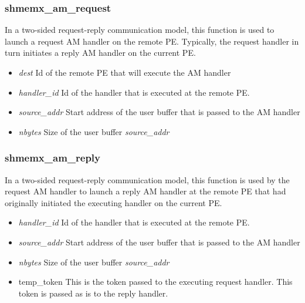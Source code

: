 \subsubsection{shmemx\_am\_request}
In a two-sided request-reply communication model, 
this function is used to launch a request AM handler on 
the remote PE. Typically, the request handler in 
turn initiates a reply AM handler on 
the current PE.\\
  


 \begin{itemize}
     \item \textit{dest} Id of the remote PE that 
         will execute the AM handler
     \item \textit{handler\_id} Id of the handler 
         that is executed at the remote PE.
     \item \textit{source\_addr} Start address of 
         the user buffer that is passed to the 
         AM handler
     \item \textit{nbytes} Size of the user buffer 
         \textit{source\_addr}
 \end{itemize}

\subsubsection{shmemx\_am\_reply}

        In a two-sided request-reply communication 
        model, this function is used by the 
        request
        AM handler to launch a reply AM handler at 
        the remote PE that had originally 
        initiated the executing handler on 
        the current PE.\\


\begin{itemize}
    \item \textit{handler\_id} Id of the handler 
        that is executed at the remote PE.
    \item \textit{source\_addr} Start address of 
        the user buffer that is passed to the AM 
        handler
    \item \textit{nbytes} Size of the user buffer 
        \textit{source\_addr}
\item {temp\_token} This is the token passed to 
     the executing request handler. This token is 
     passed as is to the reply handler.
\end{itemize}

